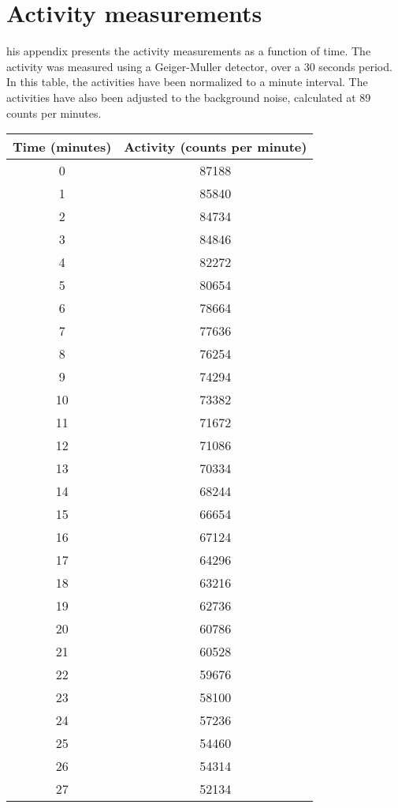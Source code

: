 %
%

\chapter{Activity measurements}
\label{app:app01}

his appendix presents the activity measurements as a function of time. The activity was measured using a Geiger-Muller detector, over a 30 seconds period. In this table, the activities have been normalized to a minute interval. The activities have also been adjusted to the background noise, calculated at 89 counts per minutes.

\begin{table}[!htb]
    \centering
        \begin{tabular}{ cc }
        \hline
        Time (minutes) & Activity (counts per minute) \\ \hline\hline
        0  & 87188 \\
		1  & 85840 \\
		2  & 84734 \\
		3  & 84846 \\
		4  & 82272 \\
		5  & 80654 \\
		6  & 78664 \\
		7  & 77636 \\
		8  & 76254 \\
		9  & 74294 \\
		10 & 73382 \\
		11 & 71672 \\
		12 & 71086 \\
		13 & 70334 \\
		14 & 68244 \\
		15 & 66654 \\
		16 & 67124 \\
		17 & 64296 \\
		18 & 63216 \\
		19 & 62736 \\
		20 & 60786 \\
		21 & 60528 \\
		22 & 59676 \\
		23 & 58100 \\
		24 & 57236 \\
		25 & 54460 \\
		26 & 54314 \\
		27 & 52134 \\

\end{tabular}
\end{table}
